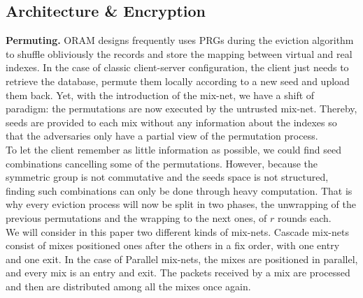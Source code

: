 \documentclass{llncs}
\begin{document}
\subsection{Architecture \& Encryption}\label{Arch}
%
\noindent\textbf{Permuting.} ORAM designs frequently uses PRGs during the eviction algorithm to shuffle obliviously the records and store the mapping between virtual and real indexes.
In the case of classic client-server configuration, the client just needs to retrieve the database, permute them locally according to a new seed and upload them back. Yet, with the introduction of the mix-net, we have a shift of paradigm: the permutations are now executed by the untrusted mix-net. Thereby, seeds are provided to each mix without any information about the indexes so that the adversaries only have a partial view of the permutation process.\\
To let the client remember as little information as possible, we could find seed combinations cancelling some of the permutations. However, because the symmetric group is not commutative and the seeds space is not structured, finding such combinations can only be done through heavy computation. That is why every eviction process will now be split in two phases, the unwrapping of the previous permutations and the wrapping to the next ones, of $r$ rounds each.\\
We will consider in this paper two different kinds of mix-nets. Cascade mix-nets consist of mixes positioned ones after the others in a fix order, with one entry and one exit. In the case of Parallel mix-nets, the mixes are positioned in parallel, and every mix is an entry and exit. The packets received by a mix are processed and then are distributed among all the mixes once again.\\
\end{document}
